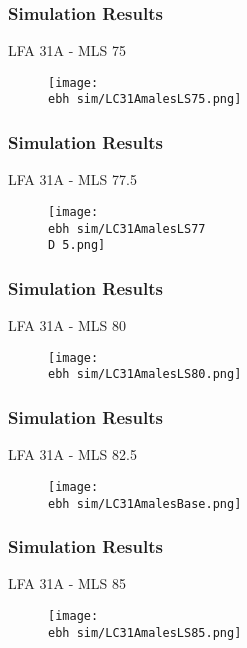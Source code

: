 \documentclass{beamer}
\newcommand{\ebh}{\string~/bio.data/bio.lobster/figures/LFA2733Framework2018/} %
\newcommand{\D}{.}
\begin{document}
\begin{frame}
\frametitle{Simulation Results}
LFA 31A - MLS 75
\begin{figure}
        \begin{center}
            \texttt{[image: \\ebh sim/LC31AmalesLS75.png]}
        \end{center}
    \end{figure}
\end{frame}


\begin{frame}
\frametitle{Simulation Results}
LFA 31A - MLS 77.5
\begin{figure}
        \begin{center}
            \texttt{[image: \\ebh sim/LC31AmalesLS77\\D 5.png]}
        \end{center}
    \end{figure}
\end{frame}


\begin{frame}
\frametitle{Simulation Results}
LFA 31A - MLS 80
\begin{figure}
        \begin{center}
            \texttt{[image: \\ebh sim/LC31AmalesLS80.png]}
        \end{center}
    \end{figure}
\end{frame}


\begin{frame}
\frametitle{Simulation Results}
LFA 31A - MLS 82.5
\begin{figure}
        \begin{center}
            \texttt{[image: \\ebh sim/LC31AmalesBase.png]}
        \end{center}
    \end{figure}
\end{frame}



\begin{frame}
\frametitle{Simulation Results}
LFA 31A - MLS 85
\begin{figure}
        \begin{center}
            \texttt{[image: \\ebh sim/LC31AmalesLS85.png]}
        \end{center}
    \end{figure}
\end{frame}
\end{document}
